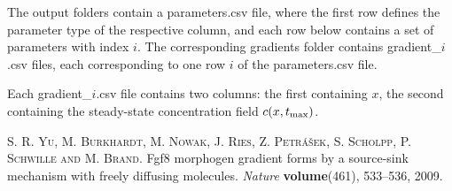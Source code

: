 \documentclass[11pt]{article}
\begin{document}
The output folders contain a parameters.csv file, where the first row defines the parameter type of the respective column, and each row below contains a set of parameters with index $i$. The corresponding gradients folder contains gradient\_$i$.csv files, each corresponding to one row $i$ of the parameters.csv file. 

Each gradient\_$i$.csv file contains two columns: the first containing $x$, the second containing the steady-state concentration field $c(x, t_{\rm{max}})$.


\begin{thebibliography}{9}
  \textsc{S. R. Yu, M. Burkhardt, M. Nowak, J. Ries, Z. Petr\'a\v{s}ek, S. Scholpp, P. Schwille and M. Brand}. Fgf8 morphogen gradient forms by a source-sink mechanism with freely diffusing molecules.
  \emph{Nature} \textbf{volume}(461),
  533--536, 2009.	
\end{thebibliography}
\end{document}
